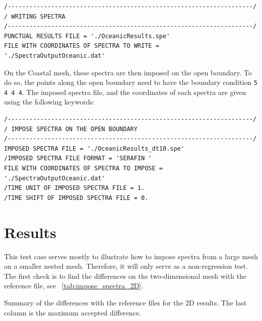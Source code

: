 \lstset{language=TelemacCas,
        basicstyle=\scriptsize\ttfamily}

\begin{lstlisting}[frame=trBL]
/--------------------------------------------------------------------/
/ WRITING SPECTRA
/--------------------------------------------------------------------/
PUNCTUAL RESULTS FILE = './OceanicResults.spe'
FILE WITH COORDINATES OF SPECTRA TO WRITE =
'./SpectraOutputOceanic.dat'
\end{lstlisting}

On the Coastal mesh, these spectra are then imposed on the open boundary. To do
so, the points along the open boundary need to have the boundary condition
\verb+5 4 4 4+. The imposed spectra file, and the coordinates of each spectra
are given using the following keywords:

\lstset{language=TelemacCas,
        basicstyle=\scriptsize\ttfamily}

\begin{lstlisting}[frame=trBL]
/--------------------------------------------------------------------/
/ IMPOSE SPECTRA ON THE OPEN BOUNDARY
/--------------------------------------------------------------------/
IMPOSED SPECTRA FILE = './OceanicResults_dt10.spe'
/IMPOSED SPECTRA FILE FORMAT = 'SERAFIN '
FILE WITH COORDINATES OF SPECTRA TO IMPOSE =
'./SpectraOutputOceanic.dat'
/TIME UNIT OF IMPOSED SPECTRA FILE = 1.
/TIME SHIFT OF IMPOSED SPECTRA FILE = 0.
\end{lstlisting}

%
%
%
\section{Results}

This test case serves mostly to illustrate how to impose spectra from a large
mesh on a smaller nested mesh. Therefore, it will only serve as a
non-regression test. The first check is to find the differences on the
two-dimensional mesh with the reference file, see
\tablename~\ref{tab:impose_spectra_2D}.

%
\begin{table}[H]
\begin{center}
%
\footnotesize
%
\caption{Summary of the differences with the reference files for the 2D results.
  The last column is the maximum accepted difference.}
\label{tab:impose_spectra_2D}
%
%
%
\end{center}
\end{table}
%


